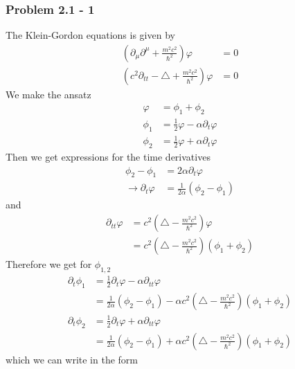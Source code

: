 \documentclass[10pt,a4paper]{book}
\theoremstyle{definition}
\begin{document}
\subsubsection{Problem 2.1 - 1}
The Klein-Gordon equations is given by
\begin{align}
    \left(\partial_\mu\partial^\mu+\frac{m^2c^2}{\hbar^2}\right)\varphi&=0\\
    \left(c^2\partial_{tt}-\triangle+\frac{m^2c^2}{\hbar^2}\right)\varphi&=0
\end{align}
We make the ansatz
\begin{align}
    \varphi&=\phi_1+\phi_2\\
    \phi_1&=\frac{1}{2}\varphi-\alpha\partial_t\varphi\\
    \phi_2&=\frac{1}{2}\varphi+\alpha\partial_t\varphi
\end{align}
Then we get expressions for the time derivatives 
\begin{align}
    \phi_2-\phi_1&=2\alpha\partial_t\varphi\\
    \rightarrow\partial_t\varphi&=\frac{1}{2\alpha}(\phi_2-\phi_1)
\end{align}
and
\begin{align}
    \partial_{tt}\varphi&=c^2\left(\triangle-\frac{m^2c^2}{\hbar^2}\right)\varphi\\
    &=c^2\left(\triangle-\frac{m^2c^2}{\hbar^2}\right)(\phi_1+\phi_2)
\end{align}
Therefore we get for $\phi_{1,2}$
\begin{align}
    \partial_t\phi_1
    &=\frac{1}{2}\partial_t\varphi-\alpha\partial_{tt}\varphi\\
    &=\frac{1}{2\alpha}(\phi_2-\phi_1)-\alpha c^2\left(\triangle-\frac{m^2c^2}{\hbar^2}\right)(\phi_1+\phi_2)\\
    \partial_t\phi_2
    &=\frac{1}{2}\partial_t\varphi+\alpha\partial_{tt}\varphi\\
    &=\frac{1}{2\alpha}(\phi_2-\phi_1)+\alpha c^2\left(\triangle-\frac{m^2c^2}{\hbar^2}\right)(\phi_1+\phi_2)
\end{align}
which we can write in the form
\end{document}

